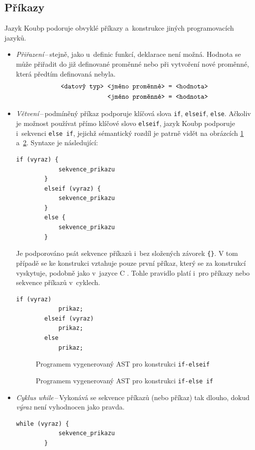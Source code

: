 \subsection*{Příkazy}
Jazyk Koubp podoruje obvyklé příkazy a~konstrukce jiných programovacích jazyků.
\begin{itemize}
    \item \emph{Přiřazení}\,--\,stejně, jako u~definic funkcí, deklarace není možná.
    Hodnota se může přiřadit do již definované proměnné nebo při vytvoření nové proměnné, která předtím definovaná nebyla.
    \begin{align*}
        \text{\texttt{<datový typ> <jméno proměnné> }} &\text{\texttt{= <hodnota>}} \\
        \text{\texttt{<jméno proměnné> }} &\text{\texttt{= <hodnota>}}        
    \end{align*}
    \item \emph{Větvení}\,--\,podmíněný příkaz podporuje klíčová slova \texttt{if}, \texttt{elseif}, \texttt{else}.
    Ačkoliv je možnost používat přímo klíčové slovo \texttt{elseif}, jazyk Koubp podporuje i~sekvenci \texttt{else if}, jejichž sémantický rozdíl je patrně vidět na obrázcích \ref{fig_ast_elseif} a~\ref{fig_ast_else_if}.
    Syntaxe je následující:
    \begin{lstlisting}[language=Koubp]
        if (vyraz) {
            sekvence_prikazu
        }
        elseif (vyraz) {
            sekvence_prikazu
        }
        else {
            sekvence_prikazu
        }
    \end{lstlisting}
    Je podporováno psát sekvence příkazů i~bez složených závorek \texttt{\{\}}.
    V tom případě se ke konstrukci vztahuje pouze první příkaz, který se za konstrukcí vyskytuje, podobně jako v~jazyce C \cite{ISO-C-Standard}.
    Tohle pravidlo platí i~pro příkazy nebo sekvence příkazů v~cyklech. 
    \begin{lstlisting}[language=Koubp]
        if (vyraz) 
            prikaz;
        elseif (vyraz)
            prikaz;
        else
            prikaz;
    \end{lstlisting}
    \begin{figure}[ht]
        \caption{Programem vygenerovaný AST pro konstrukci \texttt{if-elseif}}
        \label{fig_ast_elseif}
    \end{figure}
    \begin{figure}[ht]
        \caption{Programem vygenerovaný AST pro konstrukci \texttt{if-else if}}
        \label{fig_ast_else_if}
    \end{figure}
    \item \emph{Cyklus while}\,--\,Vykonává se sekvence příkazů (nebo příkaz) tak dlouho, dokud \emph{výraz} není vyhodnocen jako pravda.
    \begin{lstlisting}[language=Koubp]
        while (vyraz) {
            sekvence_prikazu
        }


\end{lstlisting}
\end{itemize}
